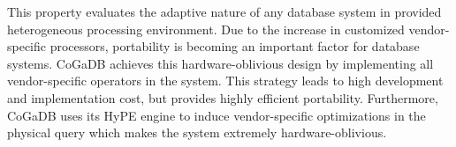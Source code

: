 This property evaluates the adaptive nature of any database system in provided heterogeneous processing environment. Due to the increase in customized vendor-specific processors, portability is becoming an important factor for database systems.
\newline
CoGaDB achieves this hardware-oblivious design by implementing all vendor-specific operators in the system. This strategy leads to high development and implementation cost, but provides highly efficient portability. Furthermore, CoGaDB uses its HyPE engine to induce vendor-specific optimizations in the physical query which makes the system extremely hardware-oblivious.